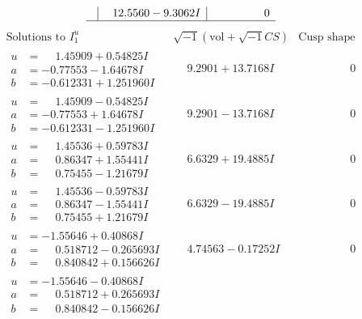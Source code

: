\documentclass[1p]{elsarticle_modified}
\theoremstyle{definition}
\newcommand{\I}{\sqrt{-1}}
\begin{document}
$$\begin{array}{c|c|c}
 & \phantom{-}12.5560 - 9.3062 I & \phantom{-0.000000 } 0\\
 \hline 
 \end{array}$$\newpage$$\begin{array}{c|c|c}  
\text{Solutions to }I^u_{1}& \I (\text{vol} + \sqrt{-1}CS) & \text{Cusp shape}\\
 \hline 
\begin{aligned}
u &= \phantom{-}1.45909 + 0.54825 I \\
a &= -0.77553 - 1.64678 I \\
b &= -0.612331 + 1.251960 I\end{aligned}
 & \phantom{-}9.2901 + 13.7168 I & \phantom{-0.000000 } 0 \\ \hline\begin{aligned}
u &= \phantom{-}1.45909 - 0.54825 I \\
a &= -0.77553 + 1.64678 I \\
b &= -0.612331 - 1.251960 I\end{aligned}
 & \phantom{-}9.2901 - 13.7168 I & \phantom{-0.000000 } 0 \\ \hline\begin{aligned}
u &= \phantom{-}1.45536 + 0.59783 I \\
a &= \phantom{-}0.86347 + 1.55441 I \\
b &= \phantom{-}0.75455 - 1.21679 I\end{aligned}
 & \phantom{-}6.6329 + 19.4885 I & \phantom{-0.000000 } 0 \\ \hline\begin{aligned}
u &= \phantom{-}1.45536 - 0.59783 I \\
a &= \phantom{-}0.86347 - 1.55441 I \\
b &= \phantom{-}0.75455 + 1.21679 I\end{aligned}
 & \phantom{-}6.6329 - 19.4885 I & \phantom{-0.000000 } 0 \\ \hline\begin{aligned}
u &= -1.55646 + 0.40868 I \\
a &= \phantom{-}0.518712 - 0.265693 I \\
b &= \phantom{-}0.840842 + 0.156626 I\end{aligned}
 & \phantom{-}4.74563 - 0.17252 I & \phantom{-0.000000 } 0 \\ \hline\begin{aligned}
u &= -1.55646 - 0.40868 I \\
a &= \phantom{-}0.518712 + 0.265693 I \\
b &= \phantom{-}0.840842 - 0.156626 I\end{aligned}

\end{array}$$
\end{document}
